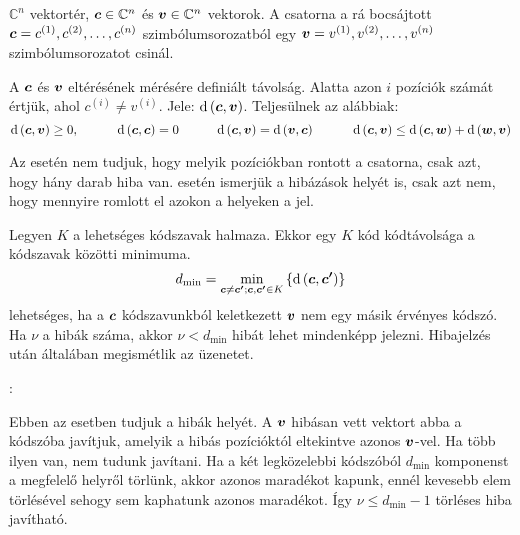 \documentclass[main.tex]{subfiles}
\begin{document}
  $\mathbb{C}^n$ vektortér, $\vb*{c} \in \mathbb{C}^n$
  és $\vb*{v} \in \mathbb{C}^n$ vektorok. A csatorna a rá
  bocsájtott $\vb*{c} = c^{(1)}, c^{(2)}, \dots, c^{(n)}$
  szimbólumsorozatból egy $\vb*{v} = v^{(1)}, v^{(2)},
  \dots, v^{(n)}$ szimbólumsorozatot csinál.

  A  $\vb*{c}$ és $\vb*{v}$
  eltérésének mérésére definiált távolság. Alatta
  azon $i$ pozíciók számát értjük, ahol
  $c^{(i)} \neq v^{(i)}$.
  Jele: $\mathrm{d}\left( \vb*{c}, \vb*{v} \right)$.
  Teljesülnek az alábbiak:
  \begin{equation*}
    \mathrm{d}\left( \vb*{c}, \vb*{v} \right) \geq 0,
    \hspace{3em}
    \mathrm{d}\left( \vb*{c}, \vb*{c} \right) = 0
    \hspace{3em}
    \mathrm{d}\left( \vb*{c}, \vb*{v} \right) =
    \mathrm{d}\left( \vb*{v}, \vb*{c} \right)
    \hspace{3em}
    \mathrm{d}\left( \vb*{c}, \vb*{v} \right) \leq
    \mathrm{d}\left( \vb*{c}, \vb*{w} \right) +
    \mathrm{d}\left( \vb*{w}, \vb*{v} \right) 
  \end{equation*}


  Az  esetén nem tudjuk,
  hogy melyik pozíciókban rontott a csatorna,
  csak azt, hogy hány darab hiba van.
   esetén ismerjük
  a hibázások helyét is, csak azt nem,
  hogy mennyire romlott el azokon a helyeken a jel.

  \vspace{.5em}
  Legyen $K$ a lehetséges kódszavak halmaza. Ekkor
  egy $K$ kód kódtávolsága a kódszavak közötti
   minimuma.
  \begin{equation*}
    d_\mathrm{{min}} = \min_{
      \vb*{c} \neq \vb*{c'};\vb*{c}, \vb*{c'} \in K
    } \left\{ \mathrm{d} \left( \vb*{c}, \vb*{c'} \right) \right\}
  \end{equation*}
   lehetséges, ha a $\vb*{c}$ kódszavunkból
  keletkezett $\vb*{v}$ nem egy másik érvényes kódszó. Ha $\nu$
  a hibák száma, akkor $\nu < d_\mathrm{min}$ hibát lehet mindenképp
  jelezni. Hibajelzés után általában megismétlik az üzenetet.

  \vspace*{1em}
  {\large {}:}
  \vspace{.5em}

  Ebben az esetben tudjuk a hibák helyét.
  A $\vb*{v}$ hibásan vett vektort abba a kódszóba javítjuk,
  amelyik a hibás pozícióktól eltekintve azonos $\vb*{v}$-vel.
  Ha több ilyen van, nem tudunk javítani.
  Ha a két legközelebbi kódszóból $d_\mathrm{min}$ komponenst
  a megfelelő helyről törlünk, akkor azonos maradékot kapunk,
  ennél kevesebb elem törlésével sehogy sem kaphatunk azonos
  maradékot. Így $\nu \leq d_\mathrm{min} - 1$ törléses hiba javítható.
\end{document}
